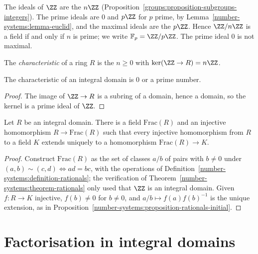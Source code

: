 \begin{example}\label{rings:example-ideals-integers}
The ideals of $\ZZ$ are the $n\ZZ$ (Proposition~\ref{groups:proposition-subgroups-integers}).
The prime ideals are $0$ and $p\ZZ$ for $p$ prime, by
Lemma~\ref{number-systems:lemma-euclid}, and the maximal ideals are the $p\ZZ$. Hence
$\ZZ/n\ZZ$ is a field if and only if $n$ is prime; we write $\mathbb{F}_p = \ZZ/p\ZZ$. The
prime ideal $0$ is not maximal.
\end{example}

\begin{definition}\label{rings:definition-characteristic}
The \emph{characteristic} of a ring $R$ is the $n \geq 0$ with $\ker(\ZZ \to R) = n\ZZ$.
\end{definition}

\begin{lemma}\label{rings:lemma-characteristic-domain}
The characteristic of an integral domain is $0$ or a prime number.
\end{lemma}

\begin{proof}
The image of $\ZZ \to R$ is a subring of a domain, hence a domain, so the kernel
is a prime ideal of $\ZZ$.
\end{proof}

\begin{proposition}\label{rings:proposition-fraction-field}
Let $R$ be an integral domain. There is a field $\mathrm{Frac}(R)$ and an injective
homomorphism $R \to \mathrm{Frac}(R)$ such that every injective homomorphism from $R$
to a field $K$ extends uniquely to a homomorphism $\mathrm{Frac}(R) \to K$.
\end{proposition}

\begin{proof}
Construct $\mathrm{Frac}(R)$ as the set of classes $a/b$ of pairs with $b \neq 0$
under $(a, b) \sim (c, d) \iff ad = bc$, with the operations of
Definition~\ref{number-systems:definition-rationals}; the verification of
Theorem~\ref{number-systems:theorem-rationals} only used that $\ZZ$ is an integral
domain. Given $f \colon R \to K$ injective, $f(b) \neq 0$ for $b \neq 0$, and
$a/b \mapsto f(a)f(b)^{-1}$ is the unique extension, as in
Proposition~\ref{number-systems:proposition-rationals-initial}.
\end{proof}

\section{Factorisation in integral domains}\label{rings:section-factorisation}

